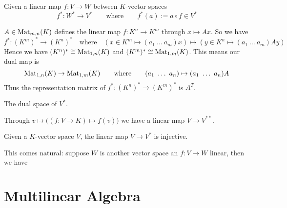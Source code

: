 \begin{definition}
   Given a linear map \(f: V \to W\) between \(K\)-vector spaces
   \[f^\ast: W^\ast \to V^\ast \qquad\text{where}\qquad f^\ast(a) := a \circ f \in V^\ast\]
\end{definition}
\begin{example}
   \(A \in \operatorname{Mat}_{m,n}(K)\) defines the linear map \(f: K^n \to K^m\) through \(x \mapsto Ax\).
   So we have
   \[f^\ast: (K^m)^\ast \to (K^n)^\ast \quad\text{where}\quad (x \in K^m \mapsto (a_1~\ldots~a_m)x) \mapsto (y \in K^n \mapsto (a_1~\ldots~a_m)Ay)\]
   Hence we have \((K^n)^\ast \cong \operatorname{Mat}_{1,n}(K)\) and \((K^m)^\ast \cong \operatorname{Mat}_{1,m}(K)\).
   This means our dual map is
   \[\operatorname{Mat}_{1,n}(K) \to \operatorname{Mat}_{1,m}(K) \qquad\text{where}\qquad (a_1~\ldots~a_n) \mapsto (a_1~\ldots~a_n)A\]
   Thus the representation matrix of \(f^\ast: (K^n)^\ast \to (K^m)^\ast\) is \(A^T\).
\end{example}

\begin{definition}
   The dual space of \(V^\ast\).
\end{definition}
\begin{remark}
   Through \(v \mapsto \big((f: V \to K) \mapsto f(v)\big)\) we have a linear map \(V \to V^{\ast\ast}\).
\end{remark}

\begin{proposition}
   Given a \(K\)-vector space \(V\), the linear map \(V \to V^\ast\) is injective.
\end{proposition}
\begin{remark}
   This comes natural: suppose \(W\) is another vector space an \(f: V \to W\) linear, then we have
   \begin{center}
   \end{center}
\end{remark}


\section{Multilinear Algebra}

